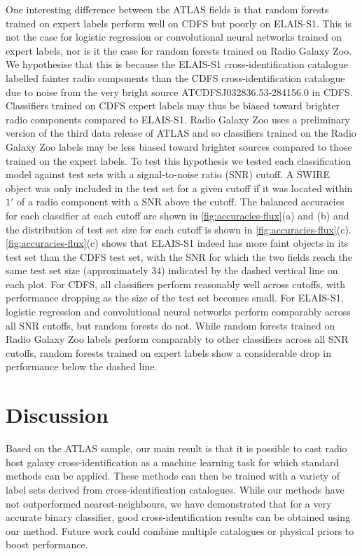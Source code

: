   One interesting difference between the ATLAS fields is that random forests
  trained on expert labels perform well on CDFS but poorly on ELAIS-S1. This
  is not the case for logistic regression or convolutional neural networks
  trained on expert labels, nor is it the case for random forests trained on
  Radio Galaxy Zoo. We hypothesise that this is because the ELAIS-S1
  cross-identification catalogue \citep{middelberg08} labelled fainter radio
  components than the CDFS cross-identification catalogue \citep{norris06} due
  to noise from the very bright source
  ATCDFS\textunderscore{}J032836.53-284156.0 in CDFS. Classifiers trained on
  CDFS expert labels may thus be biased toward brighter radio components
  compared to ELAIS-S1. Radio Galaxy Zoo uses a preliminary version of the third data release of ATLAS
  \citep{franzen15} and so classifiers trained on the Radio Galaxy Zoo labels
  may be less biased toward brighter sources compared to those trained on the
  expert labels. To test this hypothesis we tested each classification model against
  test sets with a signal-to-noise ratio (SNR) cutoff. A SWIRE object was only
  included in the test set for a given cutoff if it was located within $1'$ of
  a radio component with a SNR above the cutoff. The balanced accuracies for
  each classifier at each cutoff are shown in \autoref{fig:accuracies-flux}(a)
  and (b) and the distribution of test set size for each cutoff is shown in
  \autoref{fig:accuracies-flux}(c). \autoref{fig:accuracies-flux}(c) shows
  that ELAIS-S1 indeed has more faint objects in its test set than the CDFS test set, with the SNR for
  which the two fields reach the same test set size (approximately $34$)
  indicated by the dashed vertical line on each plot. For CDFS, all
  classifiers perform reasonably well across cutoffs, with performance
  dropping as the size of the test set becomes small. For ELAIS-S1, logistic
  regression and convolutional neural networks perform comparably across all
  SNR cutoffs, but random forests do not. While random forests trained on
  Radio Galaxy Zoo labels perform comparably to other classifiers across all
  SNR cutoffs, random forests trained on expert labels show a considerable
  drop in performance below the dashed line.

\section{Discussion}

  {Based on the ATLAS sample}, our main result is that it is possible
  to cast radio host galaxy cross-identification as a machine learning task
  for which standard methods can be applied. These methods can then be trained
  with a variety of label sets derived from cross-identification catalogues.
  While our methods have not outperformed nearest-neighbours, we have demonstrated that
  for a very accurate binary classifier, good cross-identification results can
  be obtained using our method. Future work could combine multiple catalogues
  or physical priors to boost performance.

